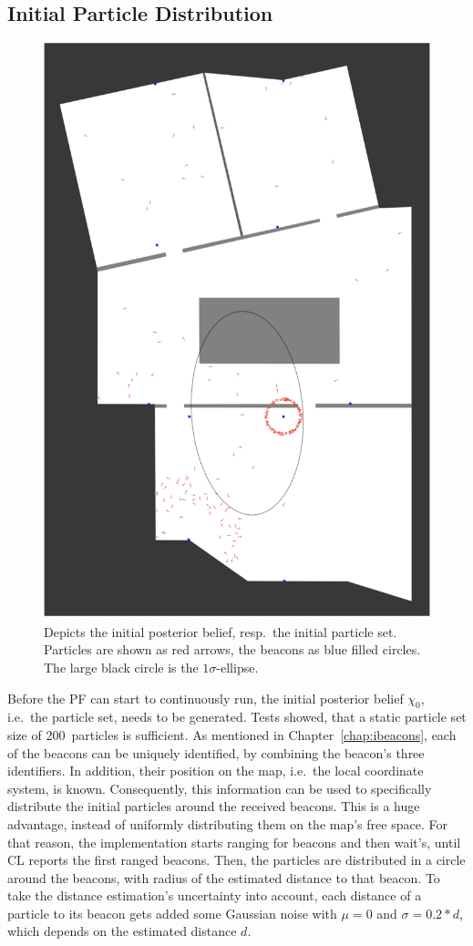 \subsection{Initial Particle Distribution}\label{sec:algo_initial}

\begin{figure}
\includegraphics[height=0.7\textwidth]{figures/algo_particle_generation}
\caption{Depicts the initial posterior belief, resp.\ the initial particle set. Particles are shown as red arrows, the beacons as blue filled circles. The large black circle is the $1\sigma$-ellipse.}
\label{fig:pf_initialDist}
\end{figure}

Before the \ac{PF} can start to continuously run, the initial posterior belief $\chi_0$, i.e.\ the particle set, needs to be generated. Tests showed, that a static particle set size of 200~particles is sufficient. As mentioned in Chapter~\ref{chap:ibeacons}, each of the beacons can be uniquely identified, by combining the beacon's three identifiers. In addition, their position on the map, i.e.\ the local coordinate system, is known. Consequently, this information can be used to specifically distribute the initial particles around the received beacons. This is a huge advantage, instead of uniformly distributing them on the map's free space. For that reason, the implementation starts ranging for beacons and then wait's, until \ac{CL} reports the first ranged beacons. Then, the particles are distributed in a circle around the beacons, with radius of the estimated distance to that beacon. To take the distance estimation's uncertainty into account, each distance of a particle to its beacon gets added some Gaussian noise with $\mu = 0$ and $\sigma = 0.2 * d$, which depends on the estimated distance $d$. 

